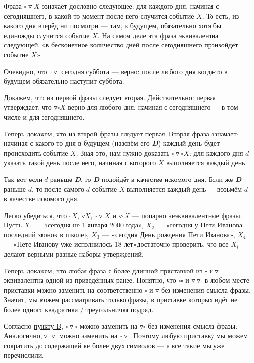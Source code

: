 \def\sq{\square}
\def\td{\triangledown}

\begin{itemize}
\itA Фраза $\sq\td X$ означает дословно следующее: для каждого дня, начиная с сегодняшнего, в какой-то момент после него случится событие $X$. То есть, из какого дня вперёд ни посмотри — там, в будущем, обязательно хотя бы единожды случится событие $X$. На самом деле эта фраза эквивалентна следующей: «в бесконечное количество дней после сегодняшнего произойдёт событие $X$».

Очевидно, что $\sq\td \text{ сегодня суббота}$ — верно: после любого дня когда-то в будущем обязательно наступит суббота.

\itB \label{logicb} Докажем, что из первой фразы следует вторая. Действительно: первая утверждает, что $\td\sq X$ верно для любого дня, начиная с сегодняшнего — в том числе и для сегодняшнего.

Теперь докажем, что из второй фразы следует первая. Вторая фраза означает: начиная с какого-то дня в будущем (назовём его {\itshape\bfseries D}) каждый день будет происходить событие $X$. Зная это, нам нужно доказать $\sq\td\sq X$: для каждого дня $d$ указать такой день после него, начиная с которого $X$ выполняется каждый день.

Так вот если $d$ раньше {\itshape\bfseries D}, то {\itshape\bfseries D} подойдёт в качестве искомого дня. Если же {\itshape\bfseries D} раньше $d$, то после самого $d$ событие $X$ выполняется каждый день — возьмём $d$ в качестве искомого дня.

\itC Легко убедиться, что $\sq X$, $\td X$, $\sq\td X$ и $\td\sq X$ — попарно неэквивалентные фразы. Пусть $X_1$ — «сегодня не 1 января 2000 года», $X_2$ — «сегодня у Пети Иванова последний звонок в школе», $X_3$ — «сегодня День рождения Пети Иванова», $X_4$ — «Пете Иванову уже исполнилось 18 лет»\scolon достаточно проверить, что все $X_i$ делают верными разные наборы утверждений.

Теперь докажем, что любая фраза с более длинной приставкой из $\sq$ и $\td$ эквивалентна одной из приведённых ранее. Понятно, что $\sq\sq$ и $\td\td$ в любом месте приставки можно заменить на соответственно $\sq$ и $\td$ без изменения смысла фразы. Значит, мы можем рассматривать только фразы, в приставке которых идёт не более одного квадратика / треугольничка подряд.

Согласно \hyperref[logicb]{пункту B}, $\sq\td\sq$ можно заменить на $\td\sq$ без изменения смысла фразы. Аналогично, $\td\sq\td$ можно заменить на $\sq\td$. Поэтому любую приставку мы можем сократить до содержащей не более двух символов — а все такие мы уже перечислили.

\end{itemize}